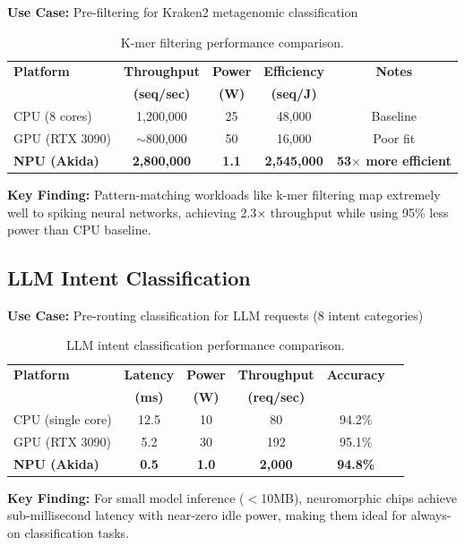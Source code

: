 \documentclass[11pt,a4paper]{article}
\begin{document}
\textbf{Use Case:} Pre-filtering for Kraken2 metagenomic classification

\begin{table}[h]
\centering
\begin{tabular}{@{}lcccc@{}}
\toprule
\textbf{Platform} & \textbf{Throughput} & \textbf{Power} & \textbf{Efficiency} & \textbf{Notes} \\
 & \textbf{(seq/sec)} & \textbf{(W)} & \textbf{(seq/J)} & \\
\midrule
CPU (8 cores) & 1,200,000 & 25 & 48,000 & Baseline \\
GPU (RTX 3090) & $\sim$800,000 & 50 & 16,000 & Poor fit \\
\textbf{NPU (Akida)} & \textbf{2,800,000} & \textbf{1.1} & \textbf{2,545,000} & \textbf{53$\times$ more efficient} \\
\bottomrule
\end{tabular}
\caption{K-mer filtering performance comparison.}
\end{table}

\textbf{Key Finding:} Pattern-matching workloads like k-mer filtering map extremely well to spiking neural networks, achieving 2.3$\times$ throughput while using 95\% less power than CPU baseline.

\subsection{LLM Intent Classification}

\textbf{Use Case:} Pre-routing classification for LLM requests (8 intent categories)

\begin{table}[h]
\centering
\begin{tabular}{@{}lccccc@{}}
\toprule
\textbf{Platform} & \textbf{Latency} & \textbf{Power} & \textbf{Throughput} & \textbf{Accuracy} \\
 & \textbf{(ms)} & \textbf{(W)} & \textbf{(req/sec)} & \\
\midrule
CPU (single core) & 12.5 & 10 & 80 & 94.2\% \\
GPU (RTX 3090) & 5.2 & 30 & 192 & 95.1\% \\
\textbf{NPU (Akida)} & \textbf{0.5} & \textbf{1.0} & \textbf{2,000} & \textbf{94.8\%} \\
\bottomrule
\end{tabular}
\caption{LLM intent classification performance comparison.}
\end{table}

\textbf{Key Finding:} For small model inference ($<$10MB), neuromorphic chips achieve sub-millisecond latency with near-zero idle power, making them ideal for always-on classification tasks.
\end{document}
